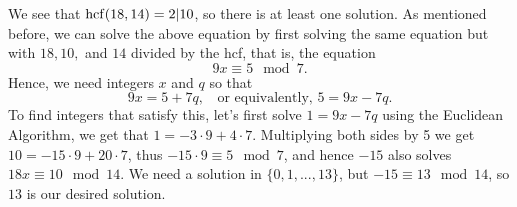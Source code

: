 \documentclass[11pt,dvipsnames]{book}
\def\hcf{{\rm hcf}}
\numberwithin{equation}{section} %
\numberwithin{figure}{section} %
\numberwithin{table}{section} %
\begin{document}
\begin{exercise}
\begin{example}
We see that $\hcf(18,14)=2|10$, so there is at least one solution. As mentioned before, we can solve the above equation by first solving the same equation but with $18,10,$ and $14$ divided by the hcf, that is, the equation 
\[
9x\equiv 5\mod 7.\] 
Hence, we need integers $x$ and $q$ so that 
\[
9x=5+7q, \;\; \mbox{ or equivalently, } 5=9x-7q.\] 
To find integers that satisfy this, let's first solve $1=9x-7q$ using the Euclidean Algorithm, we get that $1=-3\cdot 9+4\cdot 7 $. Multiplying both sides by 5 we get $10=-15\cdot 9 +20\cdot 7$, thus $-15\cdot 9\equiv 5\mod 7$, and hence $-15$ also solves $18x\equiv 10\mod 14$. We need a solution in $\{0,1,...,13\}$, but $-15\equiv 13\mod 14$, so $13$ is our desired solution. 

\end{example}

%
%
%
% 
%
%
%
%
%
%
% 
% 
%
%
%
%
%
%
%
%
% 

\end{exercise}
\end{document}
